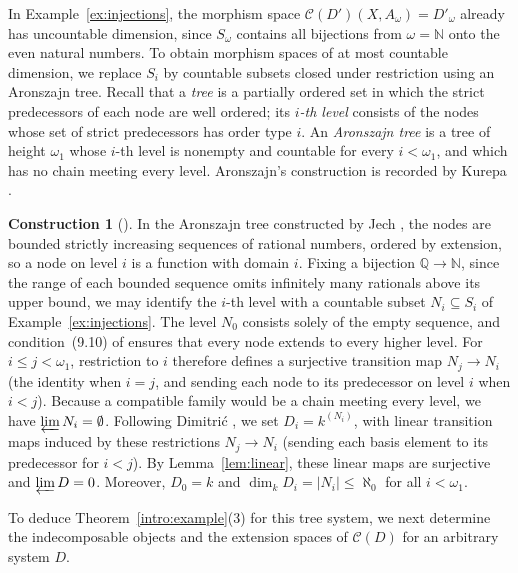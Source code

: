 \documentclass[a4paper,reqno,10pt]{amsart}
\numberwithin{equation}{section}
\theoremstyle{definition}
\newtheorem{construction}[theorem]{Construction}
\newcommand{\C}{\mathcal C}
\begin{document}
In Example~\ref{ex:injections}, the morphism space $\C(D')(X,A_\omega)=D'_\omega$
already has uncountable dimension, since $S_\omega$ contains all bijections
from $\omega=\mathbb N$ onto the even natural numbers. To obtain morphism
spaces of at most countable dimension, we replace $S_i$ by countable subsets
closed under restriction using an Aronszajn tree. Recall that a \emph{tree} is
a partially ordered set in which the strict predecessors of each node are well
ordered; its \emph{$i$-th level} consists of the nodes whose set of strict
predecessors has order type $i$. An \emph{Aronszajn tree} is a tree of height
$\omega_1$ whose $i$-th level is nonempty and countable for every $i<\omega_1$,
and which has no chain meeting every level. Aronszajn's construction is
recorded by Kurepa \cite[Th\'eor\`eme~6, p.~96, footnote~3]{Ku}.

\begin{construction}[{\cite[proof of Theorem~9.16, (9.10), pp.~116--117]{Je}}]\label{con:tree}
In the Aronszajn tree constructed by Jech \cite[proof of Theorem~9.16,
pp.~116--117]{Je}, the nodes are bounded strictly increasing sequences of
rational numbers, ordered by extension, so a node on level $i$ is a function
with domain $i$. Fixing a bijection $\mathbb Q\to\mathbb N$, since the range of
each bounded sequence omits infinitely many rationals above its upper bound, we
may identify the $i$-th level with a countable subset $N_i\subseteq S_i$ of
Example~\ref{ex:injections}. The level $N_0$ consists solely of the empty
sequence, and condition~(9.10) of \cite[pp.~116--117]{Je} ensures that every
node extends to every higher level. For $i\le j<\omega_1$, restriction to $i$
therefore defines a surjective transition map $N_j\to N_i$ (the identity when
$i=j$, and sending each node to its predecessor on level $i$ when $i<j$).
Because a compatible family would be a chain meeting every level, we have
$\varprojlim N_i=\emptyset$. Following Dimitri\'c \cite[FC2, pp.~20--21]{Di},
we set $D_i=k^{(N_i)}$, with linear transition maps induced by these
restrictions $N_j\to N_i$ (sending each basis element to its predecessor for
$i<j$). By Lemma~\ref{lem:linear}, these
linear maps are surjective and $\varprojlim D=0$. Moreover, $D_0=k$ and
$\dim_k D_i=|N_i|\le\aleph_0$ for all $i<\omega_1$.
\end{construction}

To deduce Theorem~\ref{intro:example}(3) for this tree system, we next
determine the indecomposable objects and the extension spaces of $\C(D)$ for an
arbitrary system $D$.
\end{document}
